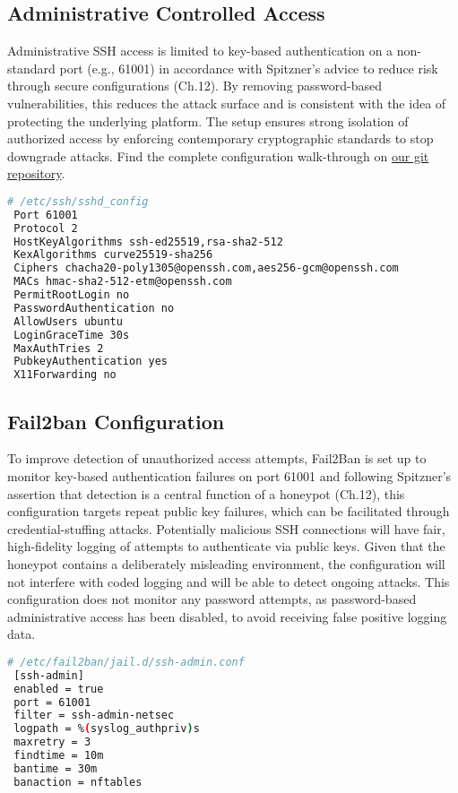 \documentclass{cls/ULBreport}
\begin{document}
        \subsection{Administrative Controlled Access}
    Administrative SSH access is limited to key-based authentication on a non-standard port (e.g., 61001) in accordance with Spitzner's advice to reduce risk through secure configurations (Ch.12). By removing password-based vulnerabilities, this reduces the attack surface and is consistent with the idea of protecting the underlying platform. The setup ensures strong isolation of authorized access by enforcing contemporary cryptographic standards to stop downgrade attacks. Find the complete configuration walk-through on \href{https://github.com/nottoBD/netsec-cowrie-honey}{our git repository}.        
        \begin{lstlisting}[language=bash,caption={Securing Legitimate Access}]
 # /etc/ssh/sshd_config
 Port 61001
 Protocol 2
 HostKeyAlgorithms ssh-ed25519,rsa-sha2-512
 KexAlgorithms curve25519-sha256
 Ciphers chacha20-poly1305@openssh.com,aes256-gcm@openssh.com
 MACs hmac-sha2-512-etm@openssh.com
 PermitRootLogin no
 PasswordAuthentication no
 AllowUsers ubuntu
 LoginGraceTime 30s
 MaxAuthTries 2
 PubkeyAuthentication yes
 X11Forwarding no\end{lstlisting}
        
        
        \subsection{Fail2ban Configuration} To improve detection of unauthorized access attempts, Fail2Ban is set up to monitor key-based authentication failures on port 61001 and following Spitzner's assertion that detection is a central function of a honeypot (Ch.12), this configuration targets repeat public key failures, which can be facilitated through credential-stuffing attacks. Potentially malicious SSH connections will have fair, high-fidelity logging of attempts to authenticate via public keys. Given that the honeypot contains a deliberately misleading environment, the configuration will not interfere with coded logging and will be able to detect ongoing attacks. This configuration does not monitor any password attempts, as password-based administrative access has been disabled, to avoid receiving false positive logging data.
        
        \begin{lstlisting}[language=bash,caption={Custom Jail Rules}]
 # /etc/fail2ban/jail.d/ssh-admin.conf
 [ssh-admin]
 enabled = true
 port = 61001
 filter = ssh-admin-netsec
 logpath = %(syslog_authpriv)s
 maxretry = 3
 findtime = 10m
 bantime = 30m
 banaction = nftables\end{lstlisting}
        
\end{document}
